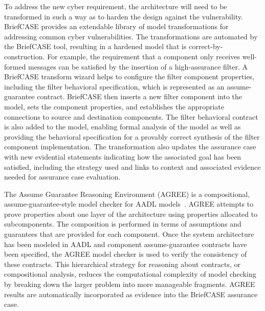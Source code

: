 To address the new cyber requirement, the architecture will need to be transformed in such a way as to harden the design against the vulnerability. BriefCASE provides an extendable library of model transformations for addressing common cyber vulnerabilities. 
The transformations are automated by the BriefCASE tool, resulting in a hardened model that is correct-by-construction. 
For example, the requirement that a component only receives well-formed messages can be satisfied by the insertion of a high-assurance filter. A BriefCASE transform wizard helps to configure the filter component properties, including the filter behavioral specification, which is represented as an assume-guarantee contract. BriefCASE then inserts a new filter component into the model, sets the component properties, and establishes the appropriate connections to source and destination components. The filter behavioral contract is also added to the model, enabling formal analysis of the model as well as providing the behavioral specification for a provably correct synthesis of the filter component implementation. 
The transformation also updates the assurance case with new evidential statements indicating how the associated goal has been satisfied, including the strategy used and links to context and associated evidence needed for assurance case evaluation.

The Assume Guarantee Reasoning Environment (AGREE) is a compositional, assume-guarantee-style model checker for AADL models~\cite{compositional-analysis-agree}. AGREE attempts to prove properties about one layer of the architecture using properties allocated to subcomponents. The composition is performed in terms of assumptions and guarantees that are provided for each component.  
Once the system architecture has been modeled in AADL and component assume-guarantee contracts have been specified, the AGREE model checker is used to verify the consistency of these contracts.
%
%
% 
This hierarchical strategy for reasoning about contracts, or compositional analysis, reduces the computational complexity of model checking by breaking down the larger problem into more manageable fragments.  AGREE results are automatically incorporated as evidence into the BriefCASE assurance case.

